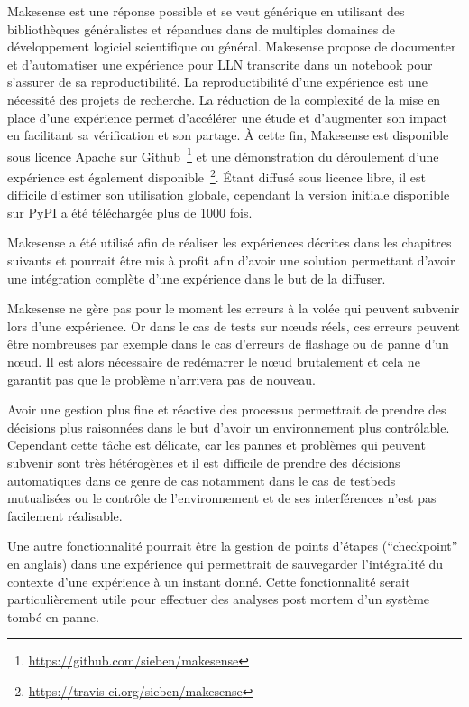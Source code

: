 Makesense est une réponse possible et se veut générique en utilisant des bibliothèques généralistes et répandues dans de multiples domaines de développement logiciel scientifique ou général.
Makesense propose de documenter et d'automatiser une expérience pour \ac{LLN} transcrite dans un notebook pour s'assurer de sa reproductibilité.
La reproductibilité d'une expérience est une nécessité des projets de recherche.
La réduction de la complexité de la mise en place d'une expérience permet d’accélérer une étude et d'augmenter son impact en facilitant sa vérification et son partage.
À cette fin, Makesense est disponible sous licence Apache sur Github~\footnote{\href{https://github.com/sieben/makesense}{https://github.com/sieben/makesense}} et une démonstration du déroulement d'une expérience est également disponible~\footnote{\href{https://travis-ci.org/sieben/makesense}{https://travis-ci.org/sieben/makesense}}.
Étant diffusé sous licence libre, il est difficile d'estimer son utilisation globale, cependant la version initiale disponible sur PyPI a été téléchargée plus de 1000 fois.

Makesense a été utilisé afin de réaliser les expériences décrites dans les chapitres suivants et pourrait être mis à profit afin d'avoir une solution permettant d'avoir une intégration complète d'une expérience dans le but de la diffuser.

Makesense ne gère pas pour le moment les erreurs à la volée qui peuvent subvenir lors d'une expérience.
Or dans le cas de tests sur nœuds réels, ces erreurs peuvent être nombreuses par exemple dans le cas d'erreurs de flashage ou de panne d'un nœud.
Il est alors nécessaire de redémarrer le nœud brutalement et cela ne garantit pas que le problème n'arrivera pas de nouveau.

Avoir une gestion plus fine et réactive des processus permettrait de prendre des décisions plus raisonnées dans le but d'avoir un environnement plus contrôlable.
Cependant cette tâche est délicate, car les pannes et problèmes qui peuvent subvenir sont très hétérogènes et il est difficile de prendre des décisions automatiques dans ce genre de cas notamment dans le cas de testbeds mutualisées ou le contrôle de l'environnement et de ses interférences n'est pas facilement réalisable.

Une autre fonctionnalité pourrait être la gestion de points d'étapes (``checkpoint'' en anglais) dans une expérience qui permettrait de sauvegarder l'intégralité du contexte d'une expérience à un instant donné.
Cette fonctionnalité serait particulièrement utile pour effectuer des analyses post mortem d'un système tombé en panne.

